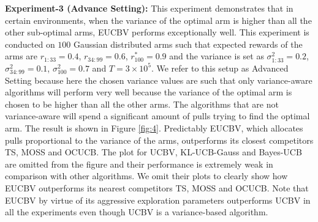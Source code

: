 
\textbf{Experiment-3 (Advance Setting):} This experiment demonstrates that in certain environments, when the variance of the optimal arm is higher than all the other sub-optimal arms, EUCBV performs exceptionally well. This experiment is conducted on $100$ Gaussian distributed arms such that expected rewards of the arms are $r_{1:33}=0.4$, $r_{34:99}=0.6$, $r^{*}_{100}=0.9$ and the variance is set as $\sigma_{1:33}^{2}=0.2$, $\sigma_{34:99}^{2}=0.1$,  $\sigma_{100}^{2}=0.7$ and $T=3\times 10^5$. We refer to this setup as Advanced Setting because here the chosen variance values are such that only variance-aware algorithms will perform very well because the variance of the optimal arm is chosen to be higher than all the other arms. The algorithms that are not variance-aware will spend a significant amount of pulls trying to find the optimal arm. The result is shown in Figure \ref{fig:4}. Predictably EUCBV, which allocates pulls proportional to the variance of the arms, outperforms its closest competitors TS, MOSS and OCUCB. The plot for UCBV, KL-UCB-Gauss and Bayes-UCB are omitted from the figure and their performance is extremely weak in comparison with other algorithms. We omit their plots to clearly show how EUCBV outperforms its nearest competitors TS, MOSS and OCUCB. Note that EUCBV by virtue of its aggressive exploration parameters outperforms UCBV in all the experiments even though UCBV is a variance-based algorithm.

